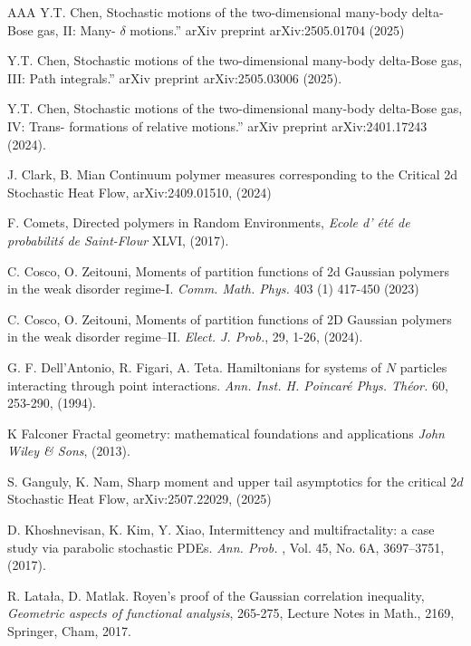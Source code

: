\documentclass[a4paper,reqno,11pt]{amsart}
\numberwithin{equation}{section}
\theoremstyle{mytheorem}
\begin{document}
{\begin{thebibliography}{AAA}
Y.T. Chen,
Stochastic motions of the two-dimensional many-body delta-Bose gas, II: Many-
$\delta$ motions.” arXiv preprint arXiv:2505.01704 (2025)

Y.T. Chen,
Stochastic motions of the two-dimensional many-body delta-Bose gas, III: Path
integrals.” arXiv preprint arXiv:2505.03006 (2025).


Y.T. Chen,
Stochastic motions of the two-dimensional many-body delta-Bose gas, IV: Trans-
formations of relative motions.” arXiv preprint arXiv:2401.17243 (2024).

J. Clark, B. Mian
Continuum polymer measures corresponding to the Critical 2d Stochastic Heat Flow,
arXiv:2409.01510, (2024)

F. Comets,  Directed polymers in Random Environments,
{\em Ecole d’ \'et\'e de probabilit\'s de Saint-Flour} XLVI, (2017). 

C. Cosco, O. Zeitouni,  
Moments of partition functions of 2d Gaussian polymers in the weak disorder regime-I. 
{\em Comm. Math. Phys.} 403 (1) 417-450 (2023) 

C. Cosco, O. Zeitouni, 
Moments of partition functions of 2D Gaussian polymers in the weak disorder regime–II. 
{\em Elect. J. Prob.}, 29, 1-26, (2024). 

G. F. Dell'Antonio, R. Figari, A. Teta.
Hamiltonians for systems of $N$ particles interacting through point interactions.
{\em  Ann. Inst. H. Poincar\'e Phys. Th\'eor.} 60, 253-290, (1994).


K Falconer
Fractal geometry: mathematical foundations and applications
{\em John Wiley \& Sons}, (2013).



S. Ganguly,  K. Nam, 
Sharp moment and upper tail asymptotics for the critical $2 d $ Stochastic Heat Flow,
arXiv:2507.22029, (2025)



D. Khoshnevisan, K. Kim, Y. Xiao,
 Intermittency and multifractality: a case study via parabolic stochastic PDEs.
 {\em Ann. Prob.} , Vol. 45, No. 6A, 3697–3751, (2017).


R. Lata\l{}a, D. Matlak.
Royen's proof of the Gaussian correlation inequality,
{\em Geometric aspects of functional analysis}, 265-275,
Lecture Notes in Math., 2169, Springer, Cham, {2017}.


\end{thebibliography}}
\end{document}
